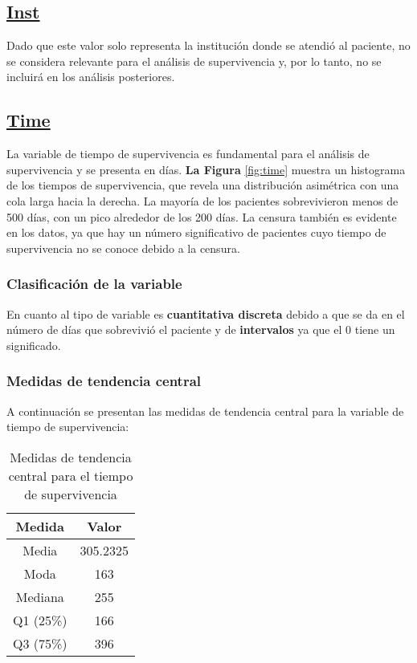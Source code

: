 \documentclass[a4paper,12pt]{article}
\begin{document}
	\subsection*{\underline{Inst}}

	Dado que este valor solo representa la institución donde se atendió al paciente, no se considera relevante para el análisis de supervivencia y, por lo tanto, no se incluirá en los análisis posteriores.

	\subsection*{\underline{Time}}

	La variable de tiempo de supervivencia es fundamental para el análisis de supervivencia y se presenta en días. \textbf{La Figura }\ref{fig:time} muestra un histograma de los tiempos de supervivencia, que revela una distribución asimétrica con una cola larga hacia la derecha. La mayoría de los pacientes sobrevivieron menos de 500 días, con un pico alrededor de los 200 días. La censura también es evidente en los datos, ya que hay un número significativo de pacientes cuyo tiempo de supervivencia no se conoce debido a la censura.
	
	\subsubsection*{Clasificación de la variable}

	En cuanto al tipo de variable es \textbf{cuantitativa discreta} debido a que se da en el número de días que sobrevivió el paciente y de \textbf{intervalos} ya que el 0 tiene un significado.


\subsubsection*{Medidas de tendencia central}

A continuación se presentan las medidas de tendencia central para la variable de tiempo de supervivencia:

\begin{table}[h!]
    \centering
    \begin{tabular}{|c|c|}
        \hline
        \textbf{Medida} & \textbf{Valor} \\
        \hline
        Media & 305.2325 \\
        \hline
        Moda & 163 \\
        \hline
        Mediana & 255 \\
        \hline
        Q1 (25\%) & 166 \\
        \hline
        Q3 (75\%) & 396 \\
        \hline
    \end{tabular}
    \caption{Medidas de tendencia central para el tiempo de supervivencia}
    \label{tab:medidas_tendencia_central}
\end{table}
\end{document}
